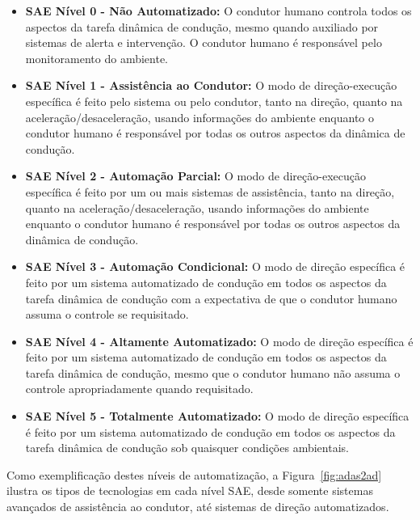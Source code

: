 \begin{itemize}
	\item \textbf{SAE Nível 0 - Não Automatizado:} O condutor humano controla todos os aspectos da tarefa dinâmica de condução, mesmo quando auxiliado por sistemas de alerta e intervenção. O condutor humano é responsável pelo monitoramento do ambiente.
	
	\item \textbf{SAE Nível 1 - Assistência ao Condutor:} O modo de direção-execução específica é feito pelo sistema ou pelo condutor, tanto na direção, quanto na aceleração/desaceleração, usando informações do ambiente  enquanto o condutor humano é responsável por todas os outros aspectos da dinâmica de condução.
	
	\item \textbf{SAE Nível 2 - Automação Parcial:} O modo de direção-execução específica é feito por um ou mais sistemas de assistência, tanto na direção, quanto na aceleração/desaceleração, usando informações do  ambiente enquanto o condutor humano é responsável por todas os outros aspectos da dinâmica de condução.
	
	\item \textbf{SAE Nível 3 - Automação Condicional:} O modo de direção específica é feito por um sistema automatizado de condução  em todos os aspectos da tarefa dinâmica de condução com a expectativa de que o condutor humano assuma o controle se requisitado.
	
	\item \textbf{SAE Nível 4 - Altamente Automatizado:} O modo de direção específica é feito por um sistema  automatizado de condução em todos os aspectos da tarefa dinâmica de condução, mesmo que o condutor humano não assuma o controle apropriadamente quando requisitado.
	
	\item \textbf{SAE Nível 5 - Totalmente Automatizado:} O modo de direção específica é feito por um sistema  automatizado de condução em todos os aspectos da tarefa dinâmica de condução sob quaisquer condições ambientais.

\end{itemize}

Como exemplificação destes níveis de automatização, a Figura~\ref{fig:adas2ad} ilustra os tipos de tecnologias em cada nível SAE, desde somente sistemas avançados de assistência ao condutor, até sistemas de direção automatizados.


